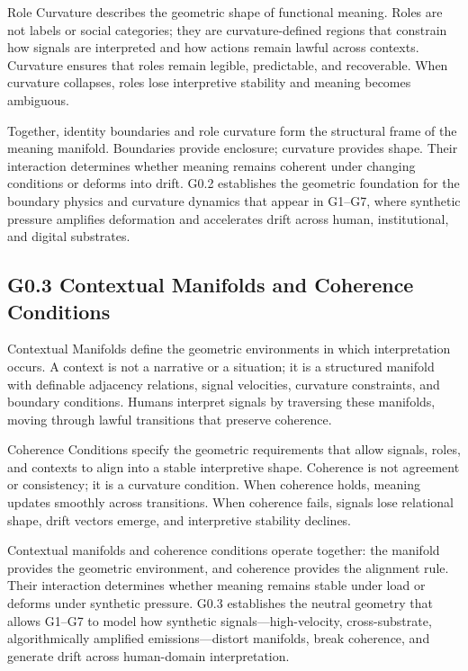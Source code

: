 \medskip

\noindent Role Curvature describes the geometric shape of functional meaning.
Roles are not labels or social categories; they are curvature-defined regions
that constrain how signals are interpreted and how actions remain lawful across
contexts. Curvature ensures that roles remain legible, predictable, and
recoverable. When curvature collapses, roles lose interpretive stability and
meaning becomes ambiguous.

\medskip

\noindent Together, identity boundaries and role curvature form the structural
frame of the meaning manifold. Boundaries provide enclosure; curvature provides
shape. Their interaction determines whether meaning remains coherent under
changing conditions or deforms into drift. G0.2 establishes the geometric
foundation for the boundary physics and curvature dynamics that appear in
G1--G7, where synthetic pressure amplifies deformation and accelerates drift
across human, institutional, and digital substrates.

\medskip

\subsection*{G0.3 Contextual Manifolds and Coherence Conditions}
\medskip

\noindent Contextual Manifolds define the geometric environments in which
interpretation occurs. A context is not a narrative or a situation; it is a
structured manifold with definable adjacency relations, signal velocities,
curvature constraints, and boundary conditions. Humans interpret signals by
traversing these manifolds, moving through lawful transitions that preserve
coherence.

\medskip

\noindent Coherence Conditions specify the geometric requirements that allow
signals, roles, and contexts to align into a stable interpretive shape. Coherence
is not agreement or consistency; it is a curvature condition. When coherence
holds, meaning updates smoothly across transitions. When coherence fails,
signals lose relational shape, drift vectors emerge, and interpretive stability
declines.

\medskip

\noindent Contextual manifolds and coherence conditions operate together: the
manifold provides the geometric environment, and coherence provides the
alignment rule. Their interaction determines whether meaning remains stable
under load or deforms under synthetic pressure. G0.3 establishes the neutral
geometry that allows G1--G7 to model how synthetic signals—high-velocity,
cross-substrate, algorithmically amplified emissions—distort manifolds, break
coherence, and generate drift across human-domain interpretation.

